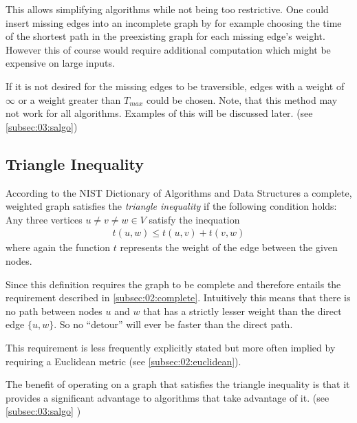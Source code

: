 This allows simplifying algorithms while not being too restrictive.
One could insert missing edges into an incomplete graph by for example choosing the time of the shortest path in the preexisting graph for each missing edge's weight.
However this of course would require additional computation which might be expensive on large inputs.

If it is not desired for the missing edges to be traversible,
edges with a weight of $\infty$ or a weight greater than $T_{max}$ could be chosen.
Note, that this method may not work for all algorithms. Examples of this will be discussed later. (see \cref{subsec:03:salgo})

\subsection{Triangle Inequality}
\label{subsec:02:triangle}

According to the NIST Dictionary of Algorithms and Data Structures \cite{black_triangle_2004} a complete,
weighted graph satisfies the \emph{triangle inequality} if the following condition holds:
Any three vertices $u \neq v \neq w \in V$ satisfy the inequation
\begin{align*}
  t(u, w) \leq t(u, v) + t(v, w) 
\end{align*}
where again the function $t$ represents the weight of the edge between the given nodes.

Since this definition requires the graph to be complete and therefore entails the requirement described in \cref{subsec:02:complete}.
Intuitively this means that there is no path between nodes $u$ and $w$ that has a strictly lesser weight
than the direct edge $\{u, w\}$. So no \enquote{detour} will ever be faster than the direct path. 

This requirement is less frequently explicitly stated \cite{santini_hazardous_2022} but more often implied by requiring a Euclidean metric (see \cref{subsec:02:euclidean}).

The benefit of operating on a graph that satisfies the triangle inequality
is that it provides a significant advantage to algorithms that take advantage of it.
(see \cref{subsec:03:salgo} )

